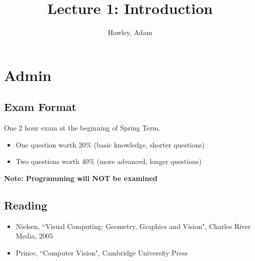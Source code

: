 \documentclass{article}
\author{Hawley, Adam}
\title{Lecture 1: Introduction}
\begin{document}
\maketitle{}
\section{Admin}
\subsection{Exam Format}
One 2 hour exam at the beginning of Spring Term.
\begin{itemize}
\item One question worth 20\% (basic knowledge, shorter questions)
\item Two questions worth 40\% (more advanced, longer questions)
\end{itemize}
{\bf Note: Programming will NOT be examined}
\subsection{Reading}
\begin{itemize}
	\item Nielsen, ``Visual Computing: Geometry, Graphics and Vision", Charles River Media, 2005
	\item Prince, ``Computer Vision", Cambridge University Press
\end{itemize}
\end{document}
